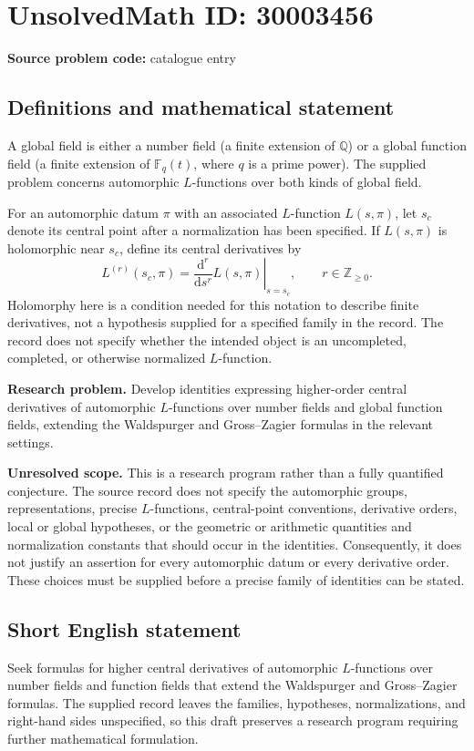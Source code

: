 \documentclass[11pt]{article}
\newcommand{\Z}{\mathbb{Z}}
\newcommand{\Q}{\mathbb{Q}}
\newcommand{\F}{\mathbb{F}}
\begin{document}
\section*{UnsolvedMath ID: 30003456}
\textbf{Source problem code:} catalogue entry
\subsection{Definitions and mathematical statement}
A global field is either a number field (a finite extension of \(\Q\)) or a global function field (a finite extension of \(\F_q(t)\), where \(q\) is a prime power). The supplied problem concerns automorphic \(L\)-functions over both kinds of global field.

For an automorphic datum \(\pi\) with an associated \(L\)-function \(L(s,\pi)\), let \(s_c\) denote its central point after a normalization has been specified. If \(L(s,\pi)\) is holomorphic near \(s_c\), define its central derivatives by
\[
L^{(r)}(s_c,\pi)=\left.\frac{\mathrm d^r}{\mathrm ds^r}L(s,\pi)\right|_{s=s_c},\qquad r\in\Z_{\geq 0}.
\]
Holomorphy here is a condition needed for this notation to describe finite derivatives, not a hypothesis supplied for a specified family in the record. The record does not specify whether the intended object is an uncompleted, completed, or otherwise normalized \(L\)-function.

\textbf{Research problem.} Develop identities expressing higher-order central derivatives of automorphic \(L\)-functions over number fields and global function fields, extending the Waldspurger and Gross--Zagier formulas in the relevant settings.

\textbf{Unresolved scope.} This is a research program rather than a fully quantified conjecture. The source record does not specify the automorphic groups, representations, precise \(L\)-functions, central-point conventions, derivative orders, local or global hypotheses, or the geometric or arithmetic quantities and normalization constants that should occur in the identities. Consequently, it does not justify an assertion for every automorphic datum or every derivative order. These choices must be supplied before a precise family of identities can be stated.
\subsection{Short English statement}
Seek formulas for higher central derivatives of automorphic \(L\)-functions over number fields and function fields that extend the Waldspurger and Gross--Zagier formulas. The supplied record leaves the families, hypotheses, normalizations, and right-hand sides unspecified, so this draft preserves a research program requiring further mathematical formulation.
\end{document}
